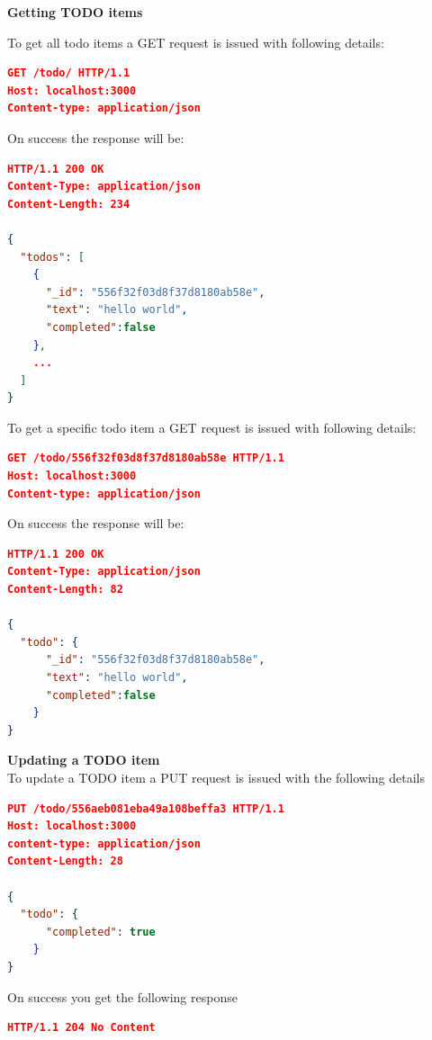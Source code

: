 \documentclass[a4paper,danish]{dnacm} %
\begin{document}
\textbf{Getting TODO items}

To get all todo items a GET request is issued with following details:

\begin{lstlisting}[language=json,firstnumber=1]
GET /todo/ HTTP/1.1
Host: localhost:3000
Content-type: application/json
\end{lstlisting}

On success the response will be:

\begin{lstlisting}[language=json,firstnumber=1]
HTTP/1.1 200 OK
Content-Type: application/json
Content-Length: 234

{
  "todos": [
    {
      "_id": "556f32f03d8f37d8180ab58e", 
      "text": "hello world", 
      "completed":false
    },
    ...
  ]
}
\end{lstlisting}

To get a specific todo item a GET request is issued with following details:

\begin{lstlisting}[language=json,firstnumber=1]
GET /todo/556f32f03d8f37d8180ab58e HTTP/1.1
Host: localhost:3000
Content-type: application/json
\end{lstlisting}

On success the response will be:

\begin{lstlisting}[language=json,firstnumber=1]
HTTP/1.1 200 OK
Content-Type: application/json
Content-Length: 82

{
  "todo": {
      "_id": "556f32f03d8f37d8180ab58e", 
      "text": "hello world", 
      "completed":false
    }
}
\end{lstlisting}

\textbf{Updating a TODO item}\\

To update a TODO item a PUT request is issued with the following details

\begin{lstlisting}[language=json,firstnumber=1]
PUT /todo/556aeb081eba49a108beffa3 HTTP/1.1
Host: localhost:3000
content-type: application/json
Content-Length: 28

{
  "todo": {
      "completed": true
    }
}
\end{lstlisting}

On success you get the following response

\begin{lstlisting}[language=json,firstnumber=1]
HTTP/1.1 204 No Content
\end{lstlisting}
\end{document}
